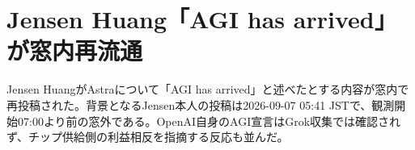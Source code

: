 \section{Jensen Huang「AGI has arrived」が窓内再流通}
Jensen HuangがAstraについて「AGI has arrived」と述べたとする内容が窓内で再投稿された。背景となるJensen本人の投稿は2026-09-07 05:41 JSTで、観測開始07:00より前の窓外である。OpenAI自身のAGI宣言はGrok収集では確認されず、チップ供給側の利益相反を指摘する反応も並んだ。
